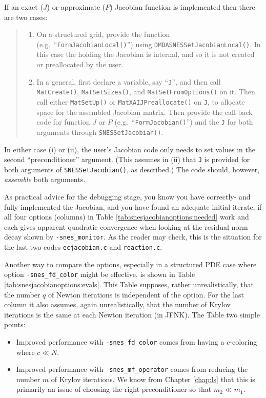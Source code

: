 If an exact ($J$) or approximate ($P$) Jacobian function is implemented then there are two cases:
\begin{quote}
  \renewcommand{\labelenumi}{(\roman{enumi})}
  \begin{enumerate}
  \item On a structured grid, provide the function (e.g.~``\texttt{FormJacobianLocal()}'') using \texttt{DMDASNESSetJacobianLocal()}.  In this case the \pMat holding the Jacobian is internal, and so it is not created or preallocated by the user.
  \item In a general, first declare a \pMat variable, say ``\texttt{J}'', and then call \texttt{MatCreate()}, \texttt{MatSetSizes()}, and \texttt{MatSetFromOptions()} on it.  Then call either \texttt{MatSetUp()} or \texttt{MatXAIJPreallocate()} on \texttt{J}, to allocate space for the assembled Jacobian matrix.  Then provide the call-back code for function $J$ or $P$ (e.g.~``\texttt{FormJacobian()}'') and the \pMat \texttt{J} for both \pMat arguments through \texttt{SNESSetJacobian()}.
  \end{enumerate}
\end{quote}
In either case (i) or (ii), the user's Jacobian code only needs to set values in the second ``preconditioner'' \pMat argument.  (This assumes in (ii) that \texttt{J} is provided for both \pMat arguments of \texttt{SNESSetJacobian()}, as described.)  The code should, however, \emph{assemble} both \pMat arguments.

As practical advice for the debugging stage, you know you have correctly- and fully-implemented the Jacobian, and you have found an adequate initial iterate, if all four options (columns) in Table \ref{tab:snesjacobianoptions:needed} work and each gives apparent quadratic convergence when looking at the residual norm decay shown by \texttt{-snes\_monitor}.  As the reader may check, this is the situation for the last two codes \texttt{ecjacobian.c} and \texttt{reaction.c}.

Another way to compare the options, especially in a structured PDE case where option \texttt{-snes\_fd\_color} might be effective, is shown in Table \ref{tab:snesjacobianoptions:evals}.  This Table supposes, rather unrealistically, that the number $q$ of Newton iterations is independent of the option.  For the last column it also assumes, again unrealistically, that the number of Krylov iterations is the same at each Newton iteration (in JFNK).  The Table two simple points:\begin{itemize}
\item Improved performance with \texttt{-snes\_fd\_color} comes from having a $c$-coloring where $c \ll N$.
\item Improved performance with \texttt{-snes\_mf\_operator} comes from reducing the number $m$ of Krylov iterations.  We know from Chapter \ref{chap:ls} that this is primarily an issue of choosing the right preconditioner so that $m_2 \ll m_1$.
\end{itemize}


